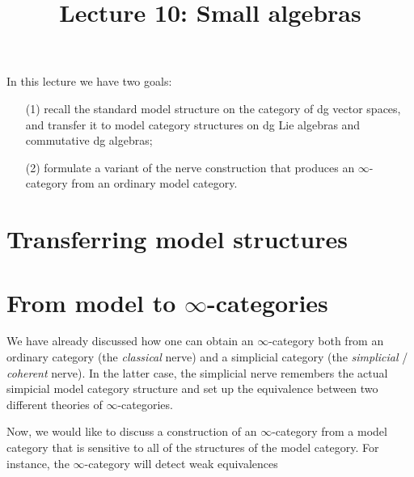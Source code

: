 \documentclass[11pt]{amsart}
\title{Lecture 10: Small algebras}
\begin{document}
\maketitle

In this lecture we have two goals: 
\begin{itemize}
\item[(1)] recall the standard model structure on the category of dg vector spaces, and transfer it to model category structures on dg Lie algebras and commutative dg algebras;
\item[(2)] formulate a variant of the nerve construction that produces an $\infty$-category from an ordinary model category. 
\end{itemize}

\section{Transferring model structures}

\section{From model to $\infty$-categories}

We have already discussed how one can obtain an $\infty$-category both from an ordinary category (the {\em classical} nerve) and a simplicial category (the {\em simplicial} / {\em coherent} nerve). 
In the latter case, the simplicial nerve remembers the actual simpicial model category structure and set up the equivalence between two different theories of $\infty$-categories. 

Now, we would like to discuss a construction of an $\infty$-category from a model category that is sensitive to all of the structures of the model category. 
For instance, the $\infty$-category will detect weak equivalences 
\end{document}
